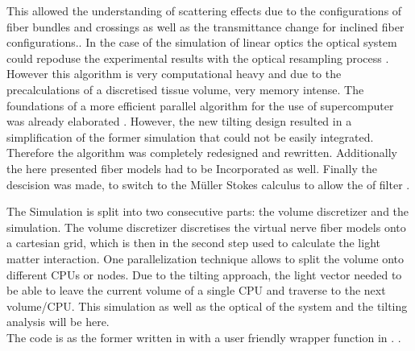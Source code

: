This allowed the understanding of scattering effects due to the configurations of fiber bundles and crossings as well as the transmittance change for inclined fiber configurations.\cite{MenzelDissertation,Menzel2020,Menzel2021}.
%  
In the case of the simulation of linear optics the optical system could repoduse the experimental results with \eg{} the optical resampling process \cite{Dohmen2015,Menzel2016}.
However this algorithm is very computational heavy and due to the precalculations of a discretised tissue volume, very memory intense.
The foundations of a more efficient parallel algorithm for the use of supercomputer was already elaborated \cite{Lucksch2016}.
However, the new tilting design resulted in a simplification of the former simulation that could not be easily integrated.
Therefore the algorithm was completely redesigned and rewritten.
Additionally the here presented fiber models had to be Incorporated as well.
Finally the descision was made, to switch to the M\"uller Stokes calculus to allow the \dummy{} of filter \dummy{}.
% 
\par
% 
The Simulation is split into two consecutive parts: the volume discretizer and the simulation.
The volume discretizer discretises the virtual nerve fiber models onto a cartesian grid, which is then in the second step used to calculate the light matter interaction.
One parallelization technique allows to split the volume onto different \acp{CPU} or nodes.
Due to the tilting approach, the light vector needed to be able to leave the current volume of a single \ac{CPU} and traverse to the next volume/\ac{CPU}.
This simulation as well as the optical \dummy{} of the system and the tilting analysis will be \dummy{} here.
\\
% 
The code is as the former written in \cpp{} with a user friendly wrapper function in \python{}.
% 
.
% 
% 
